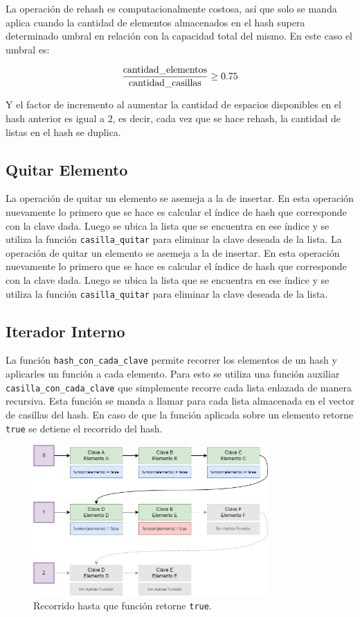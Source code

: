 \documentclass[titlepage,a4paper]{article}
\begin{document}
La operación de rehash es computacionalmente costosa, así que solo se manda aplica cuando la cantidad de elementos almacenados en el hash supera determinado umbral en relación con la capacidad total del mismo. En este caso el umbral es:

$$
\frac{\textnormal{cantidad\_elementos}}{\textnormal{cantidad\_casillas}} \ge 0.75
$$

Y el factor de incremento al aumentar la cantidad de espacios disponibles en el hash anterior es igual a $2$, es decir, cada vez que se hace rehash, la cantidad de listas en el hash se duplica.

                          \subsection{Quitar Elemento}

La operación de quitar un elemento se asemeja a la de insertar. En esta
operación nuevamente lo primero que se hace es calcular el índice de hash que
corresponde con la clave dada. Luego se ubica la lista que se encuentra en ese
índice y se utiliza la función \lstinline{casilla_quitar} para eliminar la clave
deseada de la lista.  La operación de quitar un elemento se asemeja a la de
insertar. En esta operación nuevamente lo primero que se hace es calcular el
índice de hash que corresponde con la clave dada. Luego se ubica la lista que se
encuentra en ese índice y se utiliza la función \lstinline{casilla_quitar} para
eliminar la clave deseada de la lista.

                         \subsection{Iterador Interno}

La función \lstinline{hash_con_cada_clave} permite recorrer los elementos de un hash y aplicarles un función a cada elemento. Para esto se utiliza una función auxiliar \lstinline{casilla_con_cada_clave} que simplemente recorre cada lista enlazada de manera recursiva. Esta función se manda a llamar para cada lista almacenada en el vector de casillas del hash. En caso de que la función aplicada sobre un elemento retorne \lstinline{true} se detiene el recorrido del hash.

\begin{figure}[H]
\centering
\includegraphics[width=0.8\textwidth]{img/4_recorrido.png}
\caption{\label{fig:seq04}Recorrido hasta que función retorne \lstinline{true}.}
\end{figure}
\end{document}
